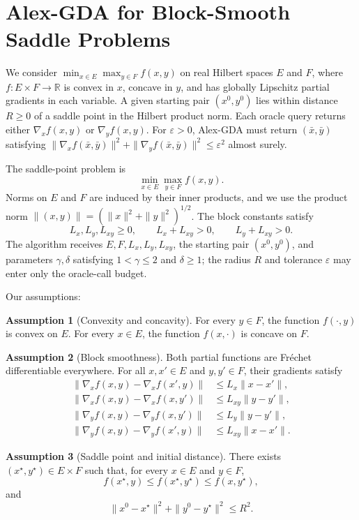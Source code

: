 \documentclass[10pt]{article}
\theoremstyle{definition}
\newtheorem{assumption}{Assumption}
\begin{document}
\section*{Alex-GDA for Block-Smooth Saddle Problems}
We consider $\min_{x\in E}\max_{y\in F} f(x,y)$ on real Hilbert spaces $E$ and $F$, where $f:E\times F\to\mathbb{R}$ is convex in $x$, concave in $y$, and has globally Lipschitz partial gradients in each variable. A given starting pair $(x^0,y^0)$ lies within distance $R\geq0$ of a saddle point in the Hilbert product norm. Each oracle query returns either $\nabla_x f(x,y)$ or $\nabla_y f(x,y)$. For $\varepsilon>0$, Alex-GDA must return $(\bar{x},\bar{y})$ satisfying $\|\nabla_x f(\bar{x},\bar{y})\|^2+\|\nabla_y f(\bar{x},\bar{y})\|^2\leq\varepsilon^2$ almost surely.

The saddle-point problem is
\[
\min_{x\in E}\max_{y\in F} f(x,y).
\]
Norms on $E$ and $F$ are induced by their inner products, and we use the product norm $\|(x,y)\|=(\|x\|^2+\|y\|^2)^{1/2}$. The block constants satisfy
\[
L_x,L_y,L_{xy}\geq0,
\qquad L_x+L_{xy}>0,
\qquad L_y+L_{xy}>0.
\]
The algorithm receives $E,F,L_x,L_y,L_{xy}$, the starting pair $(x^0,y^0)$, and parameters $\gamma,\delta$ satisfying $1<\gamma\leq2$ and $\delta\geq1$; the radius $R$ and tolerance $\varepsilon$ may enter only the oracle-call budget.

Our assumptions:
\begin{assumption}[Convexity and concavity]
For every $y\in F$, the function $f(\cdot,y)$ is convex on $E$. For every $x\in E$, the function $f(x,\cdot)$ is concave on $F$.
\end{assumption}

\begin{assumption}[Block smoothness]
Both partial functions are Fr\'echet differentiable everywhere. For all $x,x'\in E$ and $y,y'\in F$, their gradients satisfy
\[
\begin{aligned}
\|\nabla_x f(x,y)-\nabla_x f(x',y)\|
&\leq L_x\|x-x'\|,\\
\|\nabla_x f(x,y)-\nabla_x f(x,y')\|
&\leq L_{xy}\|y-y'\|,\\
\|\nabla_y f(x,y)-\nabla_y f(x,y')\|
&\leq L_y\|y-y'\|,\\
\|\nabla_y f(x,y)-\nabla_y f(x',y)\|
&\leq L_{xy}\|x-x'\|.
\end{aligned}
\]
\end{assumption}

\begin{assumption}[Saddle point and initial distance]
There exists $(x^\star,y^\star)\in E\times F$ such that, for every $x\in E$ and $y\in F$,
\[
f(x^\star,y)\leq f(x^\star,y^\star)\leq f(x,y^\star),
\]
and
\[
\|x^0-x^\star\|^2+\|y^0-y^\star\|^2\leq R^2.
\]
\end{assumption}
\end{document}
